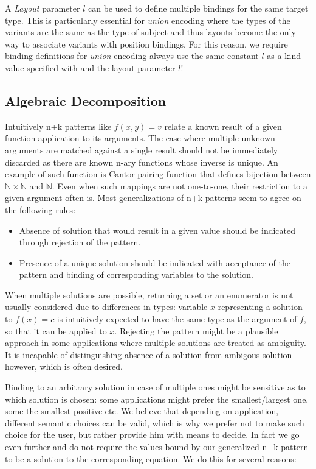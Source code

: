 A \emph{Layout} parameter $l$ can be used to define multiple bindings for the same 
target type. This is particularly essential for \emph{union} encoding where the 
types of the variants are the same as the type of subject and thus layouts 
become the only way to associate variants with position bindings. For this 
reason, we require binding definitions for \emph{union} encoding always use the 
same constant $l$ as a kind value specified with  and the layout 
parameter $l$!

\subsection{Algebraic Decomposition}
\label{sec:slv}

Intuitively n+k patterns like $f(x,y)=v$ relate a known result of a given 
function application to its arguments. The case where multiple unknown arguments 
are matched against a single result should not be immediately discarded as there 
are known n-ary functions whose inverse is unique. An example of such function 
is Cantor pairing function that defines bijection between 
$\mathbb{N}\times\mathbb{N}$ and $\mathbb{N}$. Even when such mappings are not 
one-to-one, their restriction to a given argument often is. Most generalizations 
of n+k patterns seem to agree on the following rules:

\begin{itemize}
\setlength{\itemsep}{0pt}
\setlength{\parskip}{0pt}
\item Absence of solution that would result in a given value should be indicated 
      through rejection of the pattern.
\item Presence of a unique solution should be indicated with acceptance of the 
      pattern and binding of corresponding variables to the solution.
\end{itemize}

\noindent When multiple solutions are possible, returning a set or an enumerator 
is not usually considered due to differences in types: variable $x$ representing 
a solution to $f(x)=c$ is intuitively expected to have the same type as the 
argument of $f$, so that it can be applied to $x$. Rejecting the pattern might be 
a plausible approach in some applications where multiple solutions are treated as 
ambiguity. It is incapable of distinguishing absence of a solution from ambigous 
solution however, which is often desired.

Binding to an arbitrary solution in case of multiple ones might be sensitive as 
to which solution is chosen: some applications might prefer the 
smallest/largest one, some the smallest positive etc.
We believe that depending on application, different semantic choices can be 
valid, which is why we prefer not to make such choice for the user, but rather 
provide him with means to decide. In fact we go even further and do not require 
the values bound by our generalized n+k pattern to be a solution to the 
corresponding equation. We do this for several reasons:

